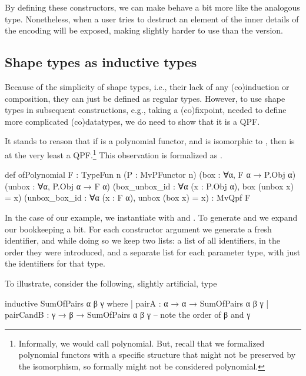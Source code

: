 By defining these constructors, we can make  behave a bit more like the analogous \inductive{}
type.
Nonetheless, when a user tries to destruct an element of  the inner details of the encoding will be exposed, 
making  slightly harder to use than the \inductive{} version.

\subsection*{Shape types as inductive types}
Because of the simplicity of shape types, i.e., their lack of any (co)induction or composition, 
they can just be defined as regular \inductive{} types.
However, to use shape types in subsequent constructions, e.g., taking a (co)fixpoint, 
needed to 
define more complicated (co)datatypes, we do need to show
that it is a QPF.\@

It stands to reason that if  is a polynomial functor, and  is isomorphic to , then  is at
the very least a QPF.\footnote{Informally, we would call  polynomial. But, recall that we formalized polynomial functors with a specific structure that might not be preserved by the isomorphism, so formally  might not be considered polynomial.}
This observation is formalized as .

\begin{leancode}
    def ofPolynomial {F : TypeFun n} 
                     (P : MvPFunctor n) 
                     (box    : ∀{α}, F α → P.Obj α) 
                     (unbox  : ∀{α}, P.Obj α → F α) 
                     (box_unbox_id : ∀{α} (x : P.Obj α), box (unbox x) = x)
                     (unbox_box_id : ∀{α} (x : F α), unbox (box x) = x)
                  : MvQpf F
\end{leancode}

In the case of our  example, we instantiate  with 
 and .
To generate  and  we expand our bookkeeping a bit. For each constructor argument
we generate a fresh identifier, and while doing so we keep two lists: a list of all identifiers, in 
the order they were introduced, and a separate list for each parameter type, with just the identifiers for that type.

To illustrate, consider the following, slightly artificial, type
\begin{leancode}
  inductive SumOfPairs α β γ where
    | pairA     : α → α → SumOfPairs α β γ 
    | pairCandB : γ → β → SumOfPairs α β γ   -- note the order of β and γ
\end{leancode}

